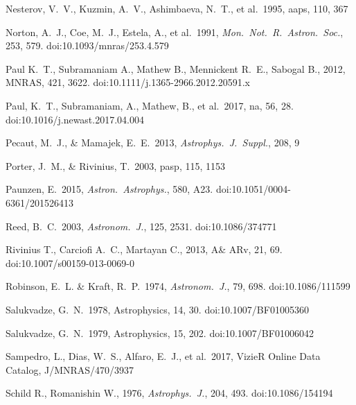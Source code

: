 \documentclass{jaa}
\def\apjs{{\it Astrophys.~J.~Suppl.}}
\def\apj{{\it Astrophys.~J.}}
\def\aj{{\it Astronom.~J.}}
\def\mnras{{\it Mon.~Not.~R.~Astron.~Soc.}}
\def\aap{{\it Astron.~Astrophys.}}
\begin{document}
\begin{thebibliography}{99}
 Nesterov, V.~V., Kuzmin, A.~V., Ashimbaeva, N.~T., et al.\ 1995, aaps, 110, 367

 Norton, A.~J., Coe, M.~J., Estela, A., et al.\ 1991, \mnras, 253, 579. doi:10.1093/mnras/253.4.579



 Paul K.~T., Subramaniam A., Mathew B., Mennickent R.~E., Sabogal B., 2012, MNRAS, 421, 3622. doi:10.1111/j.1365-2966.2012.20591.x

 Paul, K.~T., Subramaniam, A., Mathew, B., et al.\ 2017, na, 56, 28. doi:10.1016/j.newast.2017.04.004

 Pecaut, M.~J., \& Mamajek, E.~E.\ 2013, \apjs, 208, 9 

 Porter, J.~M., \& Rivinius, T.\ 2003, pasp, 115, 1153

 Paunzen, E.\ 2015, \aap, 580, A23. doi:10.1051/0004-6361/201526413

 Reed, B.~C.\ 2003, \aj, 125, 2531. doi:10.1086/374771

 Rivinius T., Carciofi A.~C., Martayan C., 2013, A\& ARv, 21, 69. doi:10.1007/s00159-013-0069-0

 Robinson, E.~L. \& Kraft, R.~P.\ 1974, \aj, 79, 698. doi:10.1086/111599

 Salukvadze, G.~N.\ 1978, Astrophysics, 14, 30. doi:10.1007/BF01005360

 Salukvadze, G.~N.\ 1979, Astrophysics, 15, 202. doi:10.1007/BF01006042

 Sampedro, L., Dias, W.~S., Alfaro, E.~J., et al.\ 2017, VizieR Online Data Catalog, J/MNRAS/470/3937


 Schild R., Romanishin W., 1976, \apj, 204, 493. doi:10.1086/154194


\end{thebibliography}
\end{document}
